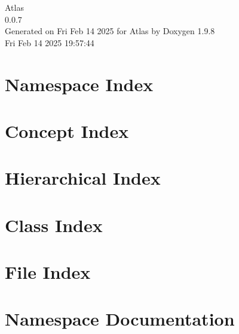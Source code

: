 \documentclass[twoside]{book}
\newcommand{\+}{\discretionary{\mbox{\scriptsize$\hookleftarrow$}}{}{}}
\newcommand{\clearemptydoublepage}{%
    \newpage{\pagestyle{empty}\cleardoublepage}%
  }
\begin{document}
  \raggedbottom
    \hypersetup{pageanchor=false,
                bookmarksnumbered=true,
                pdfencoding=unicode
               }
  \begin{titlepage}
  \vspace*{7cm}
  \begin{center}%
  {\Large Atlas}\\
  [1ex]\large 0.\+0.\+7 \\
  \vspace*{1cm}
  {\large Generated on Fri Feb 14 2025 for Atlas by Doxygen 1.9.8}\\
    \vspace*{0.5cm}
    {\small Fri Feb 14 2025 19:57:44}
  \end{center}
  \end{titlepage}
  \clearemptydoublepage
  \tableofcontents
  \clearemptydoublepage
  \hypersetup{pageanchor=true}






\chapter{Namespace Index}

\chapter{Concept Index}

\chapter{Hierarchical Index}

\chapter{Class Index}

\chapter{File Index}

\chapter{Namespace Documentation}














\end{document}
